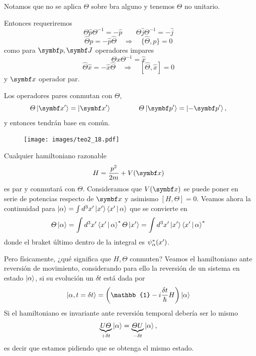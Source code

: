 \documentclass[10pt,oneside]{CBFT_book}
\begin{document}
Notamos que no se aplica $\Theta$ sobre bra alguno y tenemos $\Theta$ no unitario. 

Entonces requeriremos 
\[
	\Theta \hat{p} \Theta^{-1} = -\hat{p} \qquad \Theta \hat{j} \Theta^{-1} = -\hat{j}
\]
\[
	\hat{\Theta}\hat{p} = -\hat{p}\hat{\Theta} \quad \Rightarrow 
	\quad \{ \hat{\Theta},\hat{p}\} = 0
\]
como para $\vb{p},\vb{J}$ operadores impares 
\[
	\Theta \hat{x} \Theta^{-1} = \hat{x}
\]
\[
	\hat{\Theta}\hat{x} = -\hat{x}\hat{\Theta} \quad \Rightarrow 
	\quad [ \hat{\Theta},\hat{x} ] = 0
\]
y $\vb{x}$ operador par.

Los operadores pares conmutan con $\Theta$,
\[
	\Theta \Ket{\vb{x}'} =  \Ket{\vb{x}'} \qquad \qquad
	\Theta \Ket{\vb{p}'} =  \Ket{-\vb{p}'} ,
\]
y entonces tendrán base en común.


\begin{figure}[htb]
	\begin{center}
	\texttt{[image: images/teo2\_18.pdf]}
	\end{center}
	\caption{}
\end{figure} 

Cualquier hamiltoniano razonable
\[
	H = \frac{p^2}{2m} + V(\vb x)
\]
es par y conmutará con $\Theta$. Consideramos que $ V(\vb x)$ se puede poner en serie de potencias
respecto de $\vb x$ y asimismo $ [ H, \Theta ] = 0 $.
Veamos ahora la continuidad para $\Ket{\alpha} = \int d^3x' \Ket{x'}\Braket{x'|\alpha}$ que se convierte en
\[
	\Theta \Ket{\alpha} = \int d^3x' \Braket{x'|\alpha}^*  \Theta\Ket{x'} = 
	\int d^3x' \Ket{x'} \Braket{x'|\alpha}^* 
\]
donde el braket último dentro de la integral es $\psi^*_{\alpha}(x')$.



Pero físicamente, ¿qué significa que $H, \Theta$ conmuten? Veamos el hamiltoniano ante reversión de 
movimiento, considerando para ello la reversión de un sistema en estado $\Ket{\alpha}$, si su evolución
un $\delta t$ está dada por
\[
	\Ket{\alpha, t=\delta t} = \left( \mathbb{1} - i\frac{\delta t}{\hbar} H \right) \Ket{\alpha}
\]
Si el hamiltoniano es invariante ante reversión temporal debería ser lo mismo 
\[
	\underbrace{U \Theta}_{+\delta t} \Ket{\alpha} = \underbrace{\Theta U}_{-\delta t} \Ket{\alpha},
\]
es decir que estamos pidiendo que se obtenga el mismo estado.
\end{document}
